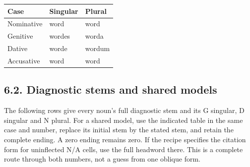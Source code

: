 \par\begingroup
\fontsize{10.5}{13.2}\selectfont
\setlength{\LTleft}{0pt}\setlength{\LTright}{\fill}
\noindent
\begin{tabular}{@{}>{\raggedright\arraybackslash}p{39.46mm}>{\raggedright\arraybackslash}p{39.46mm}>{\raggedright\arraybackslash}p{39.46mm}@{}}
\toprule
\textbf{Case} & \textbf{Singular} & \textbf{Plural} \\
\midrule
Nominative & word & word \\
Genitive & wordes & worda \\
Dative & worde & wordum \\
Accusative & word & word \\
\bottomrule
\end{tabular}
\par\endgroup

\subsection*{6.2. Diagnostic stems and shared models}

The following rows give every noun’s full diagnostic stem and its G singular, D singular and N plural. For a shared model, use the indicated table in the same case and number, replace its initial stem by the stated stem, and retain the complete ending. A zero ending remains zero. If the recipe specifies the citation form for uninflected N/\allowbreak{}A cells, use the full headword there. This is a complete route through both numbers, not a guess from one oblique form.

